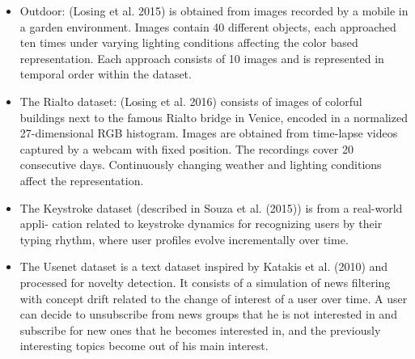 \documentclass[11pt,a4paper]{report}
\begin{document}
\begin{itemize}
\item Outdoor: (Losing et al. 2015) is obtained from images recorded by a mobile in a garden environment. Images contain 40 different objects, each approached ten times under varying lighting conditions affecting the color based representation. Each approach consists of 10 images and is represented in temporal order within the dataset. 

\item The Rialto dataset: (Losing et al. 2016) consists of images of colorful buildings next to the famous Rialto bridge in Venice, encoded in a normalized 27-dimensional RGB histogram. Images are obtained from time-lapse videos captured by a webcam with fixed position. The recordings cover 20 consecutive days. Continuously changing weather and lighting conditions affect the representation. 

\item The Keystroke dataset (described in Souza et al. (2015)) is from a real-world appli- cation related to keystroke dynamics for recognizing users by their typing rhythm, where user profiles evolve incrementally over time. 

\item The Usenet dataset is a text dataset inspired by Katakis et al. (2010) and processed for novelty detection. It consists of a simulation of news filtering with concept drift related to the change of interest of a user over time. A user can decide to unsubscribe from news groups that he is not interested in and subscribe for new ones that he becomes interested in, and the previously interesting topics become out of his main interest. 

\end{itemize}
\end{document}
